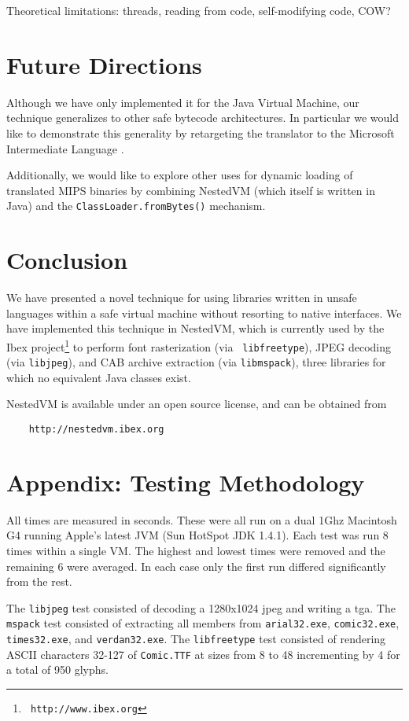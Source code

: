 \documentclass{acmconf}
\begin{document}
Theoretical limitations: threads, reading from code, self-modifying
code, COW?


\section{Future Directions}

Although we have only implemented it for the Java Virtual Machine, our
technique generalizes to other safe bytecode architectures.  In
particular we would like to demonstrate this generality by retargeting
the translator to the Microsoft Intermediate Language \cite{msil}.

Additionally, we would like to explore other uses for dynamic loading
of translated MIPS binaries by combining NestedVM (which itself is
written in Java) and the {\tt ClassLoader.fromBytes()} mechanism.


\section{Conclusion}

We have presented a novel technique for using libraries written in
unsafe languages within a safe virtual machine without resorting to
native interfaces.  We have implemented this technique in NestedVM,
which is currently used by the Ibex project\footnote{{\tt
http://www.ibex.org}} to perform font rasterization (via {\tt
libfreetype}), JPEG decoding (via {\tt libjpeg}), and CAB archive
extraction (via {\tt libmspack}), three libraries for which no
equivalent Java classes exist.

NestedVM is available under an open source license, and can be
obtained from
\begin{verbatim}
    http://nestedvm.ibex.org
\end{verbatim}


\section{Appendix: Testing Methodology}

All times are measured in seconds. These were all run on a dual 1Ghz
Macintosh G4 running Apple's latest JVM (Sun HotSpot JDK 1.4.1). Each
test was run 8 times within a single VM. The highest and lowest times
were removed and the remaining 6 were averaged.  In each case only the
first run differed significantly from the rest.

The {\tt libjpeg} test consisted of decoding a 1280x1024 jpeg and
writing a tga.  The {\tt mspack} test consisted of extracting all
members from {\tt arial32.exe}, {\tt comic32.exe}, {\tt times32.exe},
and {\tt verdan32.exe}. The {\tt libfreetype} test consisted of
rendering ASCII characters 32-127 of {\tt Comic.TTF} at sizes from 8
to 48 incrementing by 4 for a total of 950 glyphs.


\end{document}
